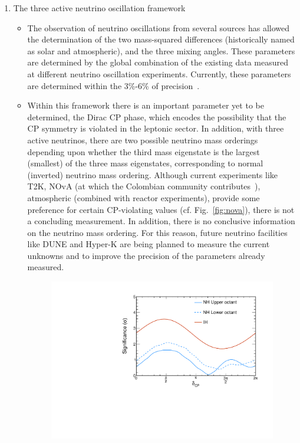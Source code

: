 \documentclass[a4paper,11pt]{article}
\begin{document}
\begin{enumerate}
    \item The three active neutrino oscillation framework
    \begin{itemize}
        \item The observation of neutrino oscillations from several sources has allowed the determination of the two mass-squared differences (historically named as solar and atmospheric), and the three mixing angles. These parameters are determined by the global combination of the existing data measured at different neutrino oscillation experiments. Currently, these parameters are determined within the 3\%-6\% of precision~\cite{deSalas:2020pgw}.
        \item Within this framework there is an important parameter yet to be determined, the Dirac CP phase, which encodes the possibility that the CP symmetry is violated in the leptonic sector. In addition, with three active neutrinos, there are two possible neutrino mass orderings depending upon whether the third mass eigenstate is the largest (smallest) of the three mass eigenstates, corresponding to normal (inverted) neutrino mass ordering. Although current experiments like T2K, NOvA (at which the Colombian community contributes~\cite{NOvA:2018gge,Acero:2018kyq,Acero:2019ksn}), atmospheric  (combined with reactor experiments), provide some preference for certain CP-violating values (cf. Fig.~\ref{fig:nova}), there is not a concluding measurement. In addition, there is no conclusive information on the neutrino mass ordering. For this reason, future neutrino facilities like DUNE and Hyper-K are being planned to measure the current unknowns and to improve the precision of the parameters already measured. 
        \begin{figure}
	    \centering
	    \includegraphics[scale=0.55]{plots/slice_delta_3curves.pdf}

\end{figure}
\end{itemize}
\end{enumerate}
\end{document}
